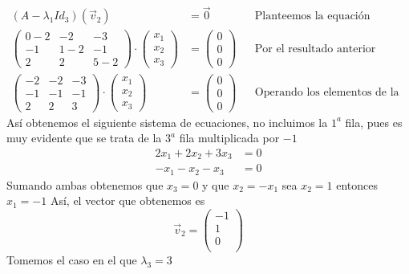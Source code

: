 \documentclass[letterpaper]{article}
\renewcommand{\*}{\cdot}
\theoremstyle{definition}
\begin{document}
\begin{align*}
(A-\lambda_1 Id_{3})(\vec{v}_2)&= \vec{0} && \text{Planteemos la equación}\\
\begin{pmatrix} 0-2 & -2 & -3 \\ -1 & 1-2 & -1 \\ 2 & 2 & 5-2 \end{pmatrix} \* \begin{pmatrix}
x_1\\
x_2\\
x_3
\end{pmatrix}  & = \begin{pmatrix}
0\\
0 \\
0
\end{pmatrix} && \text{Por el resultado anterior}\\
\begin{pmatrix} -2 & -2 & -3 \\ -1 & -1 & -1 \\ 2 & 2 & 3 \end{pmatrix} \* \begin{pmatrix}
x_1\\
x_2\\
x_3
\end{pmatrix}  & = \begin{pmatrix}
0\\
0 \\
0
\end{pmatrix} && \text{Operando los elementos de la matriz}
\end{align*}
Así obtenemos el siguiente sistema de ecuaciones, no incluimos la $ 1^a $ fila, pues es muy evidente que se trata de la $ 3^{a} $ fila multiplicada por $ -1 $
\begin{align}
2x_1 +2x_2 +3x_3 &= 0 \\
-x_1 -x_2 -x_3 &= 0 
\end{align}
Sumando ambas obtenemos que $ x_3 = 0 $ y que $ x_2 = -x_1 $ sea $ x_2 = 1 $ entonces $ x_1 = -1 $
Así, el vector que obtenemos es \[ \vec{v}_2 = \begin{pmatrix}
-1\\
1\\
0\\
\end{pmatrix}  \]
Tomemos el caso en el que $ \lambda_{3} = 3 $
\end{document}
